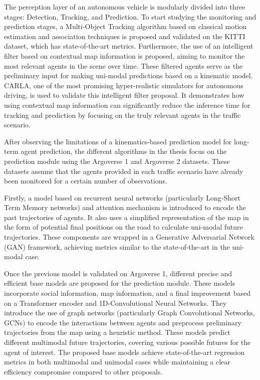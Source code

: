 The perception layer of an autonomous vehicle is modularly divided into three stages: Detection, Tracking, and Prediction. To start studying the monitoring and prediction stages, a Multi-Object Tracking algorithm based on classical motion estimation and association techniques is proposed and validated on the KITTI dataset, which has state-of-the-art metrics. Furthermore, the use of an intelligent filter based on contextual map information is proposed, aiming to monitor the most relevant agents in the scene over time. These filtered agents serve as the preliminary input for making uni-modal predictions based on a kinematic model. CARLA, one of the most promising hyper-realistic simulators for autonomous driving, is used to validate this intelligent filter proposal. It demonstrates how using contextual map information can significantly reduce the inference time for tracking and prediction by focusing on the truly relevant agents in the traffic scenario.

After observing the limitations of a kinematics-based prediction model for long-term agent prediction, the different algorithms in the thesis focus on the prediction module using the Argoverse 1 and Argoverse 2 datasets. These datasets assume that the agents provided in each traffic scenario have already been monitored for a certain number of observations.

Firstly, a model based on recurrent neural networks (particularly Long-Short Term Memory networks) and attention mechanism is introduced to encode the past trajectories of agents. It also uses a simplified representation of the map in the form of potential final positions on the road to calculate uni-modal future trajectories. These components are wrapped in a Generative Adversarial Network (GAN) framework, achieving metrics similar to the state-of-the-art in the uni-modal case.

Once the previous model is validated on Argoverse 1, different precise and efficient base models are proposed for the prediction module. These models incorporate social information, map information, and a final improvement based on a Transformer encoder and 1D-Convolutional Neural Networks. They introduce the use of graph networks (particularly Graph Convolutional Networks, GCNs) to encode the interactions between agents and preprocess preliminary trajectories from the map using a heuristic method. These models predict different multimodal future trajectories, covering various possible futures for the agent of interest. The proposed base models achieve state-of-the-art regression metrics in both multimodal and unimodal cases while maintaining a clear efficiency compromise compared to other proposals.

